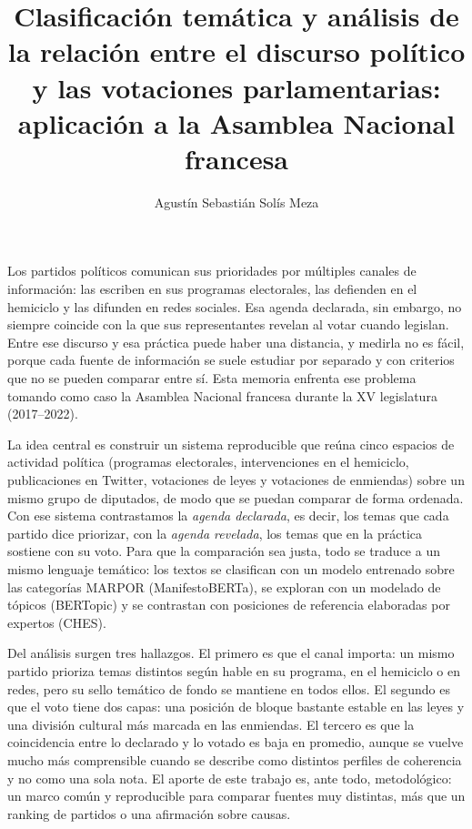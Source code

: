 \documentclass{umemoria}
\author{Agustín Sebastián Solís Meza}
\title{Clasificación temática y análisis de la relación entre el discurso político y las votaciones parlamentarias: aplicación a la Asamblea Nacional francesa}
\begin{document}
\frontmatter
\maketitle

\begin{resumen}
Los partidos políticos comunican sus prioridades por múltiples canales de
información: las escriben en sus programas electorales, las defienden en el
hemiciclo y las difunden en redes sociales. Esa agenda declarada, sin embargo, no
siempre coincide con la que sus representantes revelan al votar cuando legislan. Entre ese discurso y
esa práctica puede haber una distancia, y medirla no es fácil, porque cada fuente
de información se suele estudiar por separado y con criterios que no se pueden
comparar entre sí. Esta memoria enfrenta ese problema tomando como caso la
Asamblea Nacional francesa durante la XV legislatura (2017--2022).

La idea central es construir un sistema reproducible que reúna cinco espacios de
actividad política (programas electorales, intervenciones en el hemiciclo,
publicaciones en Twitter, votaciones de leyes y votaciones de enmiendas) sobre un
mismo grupo de diputados, de modo que se puedan comparar de forma ordenada. Con
ese sistema contrastamos la \emph{agenda declarada}, es decir, los temas que cada
partido dice priorizar, con la \emph{agenda revelada}, los temas que en la
práctica sostiene con su voto. Para que la comparación sea justa, todo se traduce
a un mismo lenguaje temático: los textos se clasifican con un modelo entrenado
sobre las categorías MARPOR (ManifestoBERTa), se exploran con un modelado de
tópicos (BERTopic) y se contrastan con posiciones de referencia elaboradas por
expertos (CHES).

Del análisis surgen tres hallazgos. El primero es que el canal importa: un mismo
partido prioriza temas distintos según hable en su programa, en el hemiciclo o en
redes, pero su sello temático de fondo se mantiene en todos ellos. El segundo es
que el voto tiene dos capas: una posición de bloque bastante estable en las leyes
y una división cultural más marcada en las enmiendas. El tercero es que la
coincidencia entre lo declarado y lo votado es baja en promedio, aunque se vuelve
mucho más comprensible cuando se describe como distintos perfiles de coherencia y
no como una sola nota. El aporte de este trabajo es, ante todo, metodológico: un
marco común y reproducible para comparar fuentes muy distintas, más que un ranking
de partidos o una afirmación sobre causas.
\end{resumen}
\end{document}
